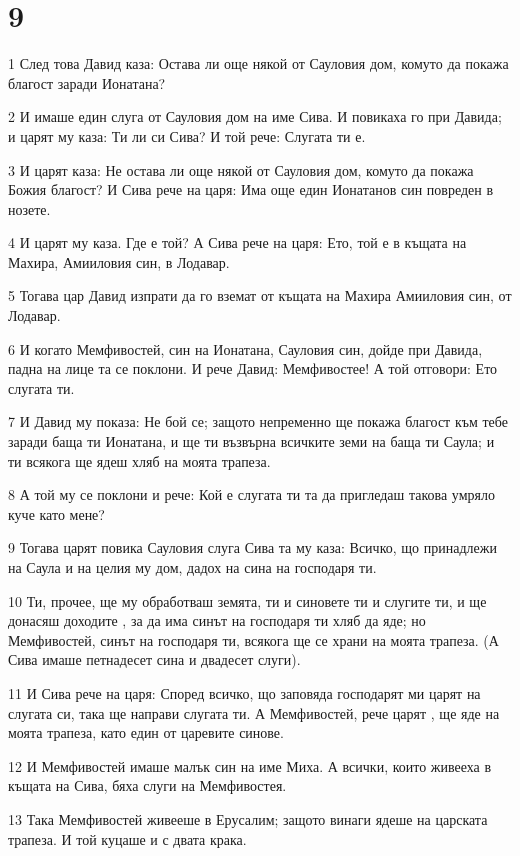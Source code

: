 \chapter{9}

\par 1 След това Давид каза: Остава ли още някой от Сауловия дом, комуто да покажа благост заради Ионатана?
\par 2 И имаше един слуга от Сауловия дом на име Сива. И повикаха го при Давида; и царят му каза: Ти ли си Сива? И той рече: Слугата ти е.
\par 3 И царят каза: Не остава ли още някой от Сауловия дом, комуто да покажа Божия благост? И Сива рече на царя: Има още един Ионатанов син повреден в нозете.
\par 4 И царят му каза. Где е той? А Сива рече на царя: Ето, той е в къщата на Махира, Амииловия син, в Лодавар.
\par 5 Тогава цар Давид изпрати да го вземат от къщата на Махира Амииловия син, от Лодавар.
\par 6 И когато Мемфивостей, син на Ионатана, Сауловия син, дойде при Давида, падна на лице та се поклони. И рече Давид: Мемфивостее! А той отговори: Ето слугата ти.
\par 7 И Давид му показа: Не бой се; защото непременно ще покажа благост към тебе заради баща ти Ионатана, и ще ти възвърна всичките земи на баща ти Саула; и ти всякога ще ядеш хляб на моята трапеза.
\par 8 А той му се поклони и рече: Кой е слугата ти та да пригледаш такова умряло куче като мене?
\par 9 Тогава царят повика Сауловия слуга Сива та му каза: Всичко, що принадлежи на Саула и на целия му дом, дадох на сина на господаря ти.
\par 10 Ти, прочее, ще му обработваш земята, ти и синовете ти и слугите ти, и ще донасяш доходите , за да има синът на господаря ти хляб да яде; но Мемфивостей, синът на господаря ти, всякога ще се храни на моята трапеза. (А Сива имаше петнадесет сина и двадесет слуги).
\par 11 И Сива рече на царя: Според всичко, що заповяда господарят ми царят на слугата си, така ще направи слугата ти. А Мемфивостей, рече царят , ще яде на моята трапеза, като един от царевите синове.
\par 12 И Мемфивостей имаше малък син на име Миха. А всички, които живееха в къщата на Сива, бяха слуги на Мемфивостея.
\par 13 Така Мемфивостей живееше в Ерусалим; защото винаги ядеше на царската трапеза. И той куцаше и с двата крака.

